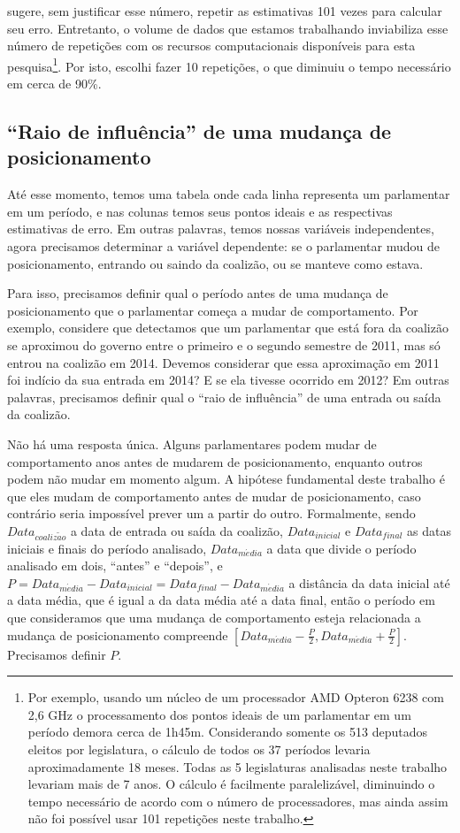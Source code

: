 \documentclass[a4paper,titlepage]{ppgi}\usepackage[]{graphicx}\usepackage[]{color}
\begin{document}
 sugere, sem justificar esse número, repetir as
estimativas 101 vezes para calcular seu erro. Entretanto, o volume de dados que
estamos trabalhando inviabiliza esse número de repetições com os recursos
computacionais disponíveis para esta pesquisa\footnote{Por exemplo, usando um
núcleo de um processador AMD Opteron\texttrademark{} 6238 com 2,6 GHz o
processamento dos pontos ideais de um parlamentar em um período demora cerca de
1h45m. Considerando somente os 513 deputados eleitos por legislatura, o
cálculo de todos os 37 períodos levaria aproximadamente 18 meses. Todas as 5
legislaturas analisadas neste trabalho levariam mais de 7 anos. O cálculo é
facilmente paralelizável, diminuindo o tempo necessário de acordo com o número
de processadores, mas ainda assim não foi possível usar 101 repetições neste
trabalho.}. Por isto, escolhi fazer 10 repetições, o que diminuiu o tempo
necessário em cerca de 90\%.

\subsection{``Raio de influência'' de uma mudança de posicionamento}
\label{cap:desenvolvimento:raio-de-influencia}

Até esse momento, temos uma tabela onde cada linha representa um parlamentar em
um período, e nas colunas temos seus pontos ideais e as respectivas estimativas
de erro. Em outras palavras, temos nossas variáveis independentes, agora
precisamos determinar a variável dependente: se o parlamentar mudou de
posicionamento, entrando ou saindo da coalizão, ou se manteve como estava.

Para isso, precisamos definir qual o período antes de uma mudança de
posicionamento que o parlamentar começa a mudar de comportamento. Por exemplo,
considere que detectamos que um parlamentar que está fora da coalizão se
aproximou do governo entre o primeiro e o segundo semestre de 2011, mas só
entrou na coalizão em 2014. Devemos considerar que essa aproximação em 2011 foi
indício da sua entrada em 2014? E se ela tivesse ocorrido em 2012?  Em outras
palavras, precisamos definir qual o ``raio de influência'' de uma entrada ou
saída da coalizão.

Não há uma resposta única. Alguns parlamentares podem mudar de comportamento
anos antes de mudarem de posicionamento, enquanto outros podem não mudar em
momento algum. A hipótese fundamental deste trabalho é que eles mudam de
comportamento antes de mudar de posicionamento, caso contrário seria impossível
prever um a partir do outro. Formalmente, sendo $Data_{coaliz\tilde{a}o}$ a
data de entrada ou saída da coalizão, $Data_{inicial}$ e $Data_{final}$ as
datas iniciais e finais do período analisado, $Data_{m\acute{e}dia}$ a data que
divide o período analisado em dois, ``antes'' e ``depois'', e $P =
Data_{m\acute{e}dia} - Data_{inicial} = Data_{final} -
Data_{m\acute{e}dia}$ a distância da data inicial até a data média, que é igual
a da data média até a data final, então o período em que consideramos que uma
mudança de comportamento esteja relacionada a mudança de posicionamento
compreende $\left[Data_{m\acute{e}dia} - \frac{P}{2}, Data_{m\acute{e}dia} +
\frac{P}{2}\right]$. Precisamos definir $P$.
\end{document}
